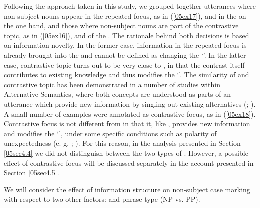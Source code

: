 \documentclass[output=paper,colorlinks,citecolor=brown]{langscibook}
\begin{document}
Following the approach taken in this study, we grouped together utterances where non-subject nouns appear in the repeated focus, as in (\ref{05ex17}), and in the  on the one hand, and those where non-subject nouns are part of the contrastive topic, as in (\ref{05ex16}), and of the . The rationale behind both decisions is based on information novelty. In the former case, information in the repeated focus is already brought into the  and cannot be defined as changing the `'. In the latter case, contrastive topic turns out to be very close to , in that the contrast itself contributes to existing knowledge and thus modifies the `'. The similarity of  and contrastive topic has been demonstrated in a number of studies within Alternative Semantics, where both concepts are understood as parts of an utterance which provide new information by singling out existing alternatives (\citealt[75--77]{rooth1992}; \citealt[64--68]{buring2016}). A small number of examples were annotated as contrastive focus, as in (\ref{05ex18}). Contrastive focus is not different from  in that it, like , provides new information and modifies the `', under some specific conditions such as polarity of unexpectedness (e. g. \citealt[348]{zimmermann2008}; \citealt[117--126]{goodhue2022}). For this reason, in the analysis presented in Section \ref{05sec4.4} we did not distinguish between the two types of . However, a possible effect of contrastive focus will be discussed separately in the account presented in Section \ref{05sec4.5}.

We will consider the effect of information structure on non-subject case marking with respect to two other factors:  and phrase type (NP vs. PP).
\end{document}
